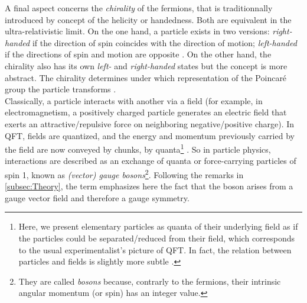 A final aspect concerns the \textit{chirality} of the fermions, that is traditionnally introduced by concept of the helicity or handedness. Both are equivalent in the ultra-relativistic limit. On the one hand, a particle exists in two versions: \textit{right-handed} if the direction of spin coincides with the direction of motion; \textit{left-handed} if the directions of spin and motion are opposite \cite{thomsonModernParticlePhysics2013}. On the other hand, the chirality also has its own \textit{left-} and \textit{right-handed} states but the concept is more abstract. The chirality determines under which representation of the Poincaré group the particle transforms \cite{quantumdiariesHelicityChiralityMass2011}.\\


Classically, a particle interacts with another via a field (for example, in electromagnetism, a positively charged particle generates an electric field that exerts an attractive/repulsive force on neighboring negative/positive charge). In QFT, fields are quantized, and the energy and momentum previously carried by the field are now conveyed by chunks, by quanta\footnote{Here, we present elementary particles as quanta  of their underlying field as if the particles could be separated/reduced from their field, which corresponds to the usual experimentalist's picture of QFT. In fact, the relation between particles and fields is slightly more subtle \cite{jaegerElementaryParticlesQuantum2021}.} \cite{serwayModernPhysics2004}. So in particle physics, interactions are described as an exchange of quanta or force-carrying particles of spin 1, known as \textit{(vector) gauge bosons}\footnote{They are called \textit{bosons} because, contrarly to the fermions, their intrinsic angular momentum (or spin) has an integer value.}\cite{braibantParticlesFundamentalInteractions2012}\cite{thomsonModernParticlePhysics2013}. Following the remarks in \Sec\ref{subsec:Theory}, the term  emphasizes here the fact that the boson arises from a gauge vector field and therefore a gauge symmetry. 

